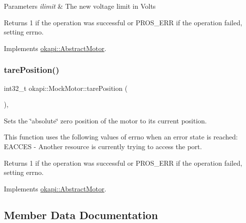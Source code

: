 \begin{DoxyParams}{Parameters}
{\em ilimit} & The new voltage limit in Volts \\
\hline
\end{DoxyParams}
\begin{DoxyReturn}{Returns}
1 if the operation was successful or P\+R\+O\+S\+\_\+\+E\+RR if the operation failed, setting errno. 
\end{DoxyReturn}


Implements \mbox{\hyperlink{classokapi_1_1AbstractMotor_a2f33faf946b99cd34e9a591ccc33d644}{okapi\+::\+Abstract\+Motor}}.

\mbox{\label{classokapi_1_1MockMotor_a80592813f7053d3468c99a7651e5514f}} 
\subsubsection{\texorpdfstring{tarePosition()}{tarePosition()}}
{\footnotesize\ttfamily int32\+\_\+t okapi\+::\+Mock\+Motor\+::tare\+Position (\begin{DoxyParamCaption}{ }\end{DoxyParamCaption})\hspace{0.3cm}{\ttfamily [override]}, {\ttfamily [virtual]}}



Sets the \char`\"{}absolute\char`\"{} zero position of the motor to its current position. 

This function uses the following values of errno when an error state is reached\+: E\+A\+C\+C\+ES -\/ Another resource is currently trying to access the port.

\begin{DoxyReturn}{Returns}
1 if the operation was successful or P\+R\+O\+S\+\_\+\+E\+RR if the operation failed, setting errno. 
\end{DoxyReturn}


Implements \mbox{\hyperlink{classokapi_1_1AbstractMotor_ac36edbc92db85a11adcfee56275de15b}{okapi\+::\+Abstract\+Motor}}.



\subsection{Member Data Documentation}
\mbox{\label{classokapi_1_1MockMotor_a2dde4bb999510d533d243cd4d2d8126e}} 
